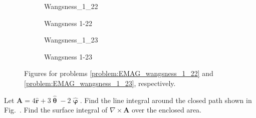 \documentclass[crop=false,class=article,oneside]{standalone}
\begin{document}
        \begin{figure}[H]
            \centering
            \captionsetup{type=figure}
            \begin{subfigure}[b]{0.49\textwidth}
                \centering
                \captionsetup{type=figure}
                {Wangsness_1_22}
                \caption{Wangsness 1-22}
                \label{fig:EMAG_1_wangsness_1_22}
            \end{subfigure}
            \begin{subfigure}[b]{0.49\textwidth}
                \centering
                \captionsetup{type=figure}
                {Wangsness_1_23}
                \caption{Wangsness 1-23}
                \label{fig:EMAG_1_wangsness_1_23}
            \end{subfigure}
            \caption[Figures for Wangsness 1-22 and 1-23]{%
                Figures for problems \ref{problem:EMAG_wangsness_1_22}
                and \ref{problem:EMAG_wangsness_1_23}, respectively.
            }
        \end{figure}
        \begin{problem}[Wangsness 1-23]
            \label{problem:EMAG_wangsness_1_23}
            Let $\mathbf{A}=4\hat{\mathbf{r}}+3\hat{\boldsymbol{\uptheta}}
            -2\hat{\boldsymbol{\upvarphi}}$. Find the line integral
            around the closed path shown in
            Fig.~.
            Find the surface integral of
            $\nabla \times \mathbf{A}$ over the enclosed area.
        \end{problem}
\end{document}

